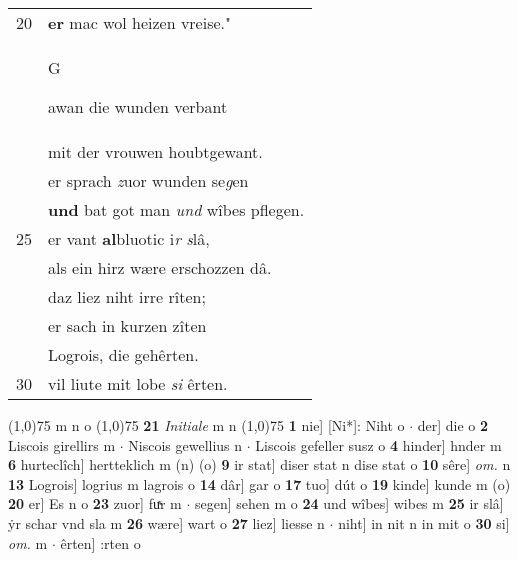 \documentclass[8pt,a4paper,notitlepage]{article}
\begin{document}
\begin{table}[ht]
\begin{minipage}[t]{0.5\linewidth}
\begin{tabular}{rl}
20 & \textbf{er} mac wol heizen vreise."\\ 
 & \begin{large}G\end{large}awan die wunden verbant\\ 
 & mit der vrouwen houbtgewant.\\ 
 & er sprach \textit{z}uor wunden se\textit{g}en\\ 
 & \textbf{und} bat got man \textit{und} wîbes pflegen.\\ 
25 & er vant \textbf{al}bluotic i\textit{r} \textit{s}lâ,\\ 
 & als ein hirz wære erschozzen dâ.\\ 
 & daz liez niht irre rîten;\\ 
 & er sach in kurzen zîten\\ 
 & Logrois, die gehêrten.\\ 
30 & vil liute mit lobe \textit{si} êrten.\\ 
\end{tabular}
\scriptsize
\line(1,0){75} \newline
m n o \newline
\line(1,0){75} \newline
\textbf{21} \textit{Initiale} m n  \newline
\line(1,0){75} \newline
\textbf{1} nie] [Ni*]: Niht o  $\cdot$ der] die o \textbf{2} Liscois girellirs m  $\cdot$ Niscois gewellius n  $\cdot$ Liscois gefeller susz o \textbf{4} hinder] hnder m \textbf{6} hurteclîch] hertteklich m (n) (o) \textbf{9} ir stat] diser stat n dise stat o \textbf{10} sêre] \textit{om.} n \textbf{13} Logrois] logrius m lagrois o \textbf{14} dâr] gar o \textbf{17} tuo] dút o \textbf{19} kinde] kunde m (o) \textbf{20} er] Es n o \textbf{23} zuor] fuͯr m  $\cdot$ segen] sehen m o \textbf{24} und wîbes] wibes m \textbf{25} ir slâ] ẏr schar vnd sla m \textbf{26} wære] wart o \textbf{27} liez] liesse n  $\cdot$ niht] in nit n in mit o \textbf{30} si] \textit{om.} m  $\cdot$ êrten] :rten o \newline
\end{minipage}
\end{table}
\newpage
\end{document}
